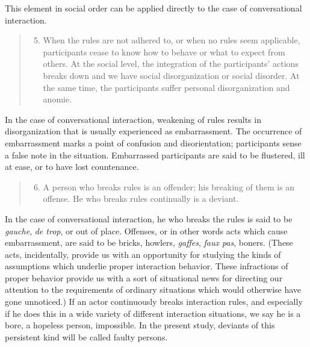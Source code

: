 \documentclass[openany,nobib]{tufte-book}
\begin{document}
\noindent This element in social order can be applied directly to the case of
conversational interaction.

\begin{quote}
\begin{enumerate}
\setcounter{enumi}{4}
\item
  When the rules are not adhered to, or when no rules seem applicable,
  participants cease to know how to behave or what to expect from
  others. At the social level, the integration of the participants'
  actions breaks down and we have social disorganization or social
  disorder. At the same time, the participants suffer personal
  disorganization and anomie.
\end{enumerate}
\end{quote}

\noindent In the case of conversational interaction, weakening of rules results in
disorganization that is usually experienced as embarrassment. The
occurrence of embarrassment marks a point of confusion and
disorientation; participants sense a false note in the situation.
Embarrassed participants are said to be flustered, ill at ease, or to
have lost countenance.

\newpage

\begin{quote}
\begin{enumerate}
\setcounter{enumi}{5}
\item
  A person who breaks rules is an offender; his breaking of them is an
  offense. He who breaks rules continually is a deviant.
\end{enumerate}
\end{quote}

\noindent In the case of conversational interaction, he who breaks the rules is
said to be \emph{gauche}, \emph{de trop}, or out of place. Offenses, or
in other words acts which cause embarrassment, are said to be bricks,
howlers, \emph{gaffes}, \emph{faux pas}, boners. (These acts,
incidentally, provide us with an opportunity for studying the kinds of
assumptions which underlie proper interaction behavior. These
infractions of proper behavior provide us with a sort of situational
news for directing our attention to the requirements of ordinary
situations which would otherwise have gone unnoticed.) If an actor
continuously breaks interaction rules, and especially if he does this in
a wide variety of different interaction situations, we say he is a bore,
a hopeless person, impossible. In the present study, deviants of this
persistent kind will be called faulty persons.
\end{document}
